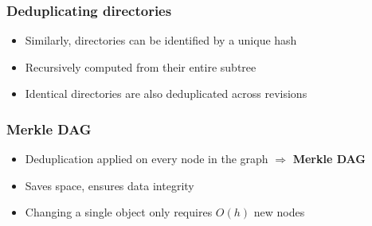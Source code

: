 \documentclass[aspectratio=169,xcolor=table]{beamer}
\begin{document}
    \begin{frame}
        \frametitle{Deduplicating directories}
        \begin{block}{}
            \begin{itemize}
                \item Similarly, directories can be identified by a unique hash
                \item Recursively computed from their entire subtree
                \item Identical directories are also deduplicated across
                    revisions
            \end{itemize}
        \end{block}
        \vfill
        \begin{figure}
            \centering
            \scalebox{0.8}{}
        \end{figure}
    \end{frame}

    \begin{frame}
        \frametitle{Merkle DAG}
        \begin{block}{}
            \begin{itemize}
                \item Deduplication applied on every node in the graph
                    $\Rightarrow$ \textbf{Merkle DAG}
                \item Saves space, ensures data integrity
                \item Changing a single object only requires
                    $O(h)$ new nodes
            \end{itemize}
        \end{block}
        \vfill
        \begin{figure}
            \centering
            \scalebox{0.8}{}
        \end{figure}
    \end{frame}
\end{document}
